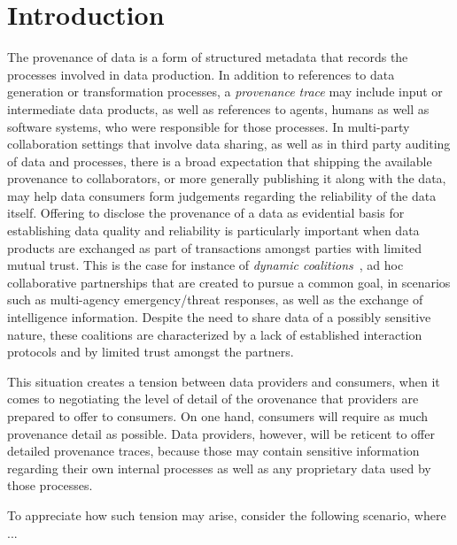 
\section{Introduction}


The provenance of data is a form of structured metadata that records the processes involved in data production. In addition to references to data generation or transformation processes, a \textit{provenance trace} may include input  or intermediate data products, as well as references to agents, humans as well as software systems, who were responsible for those processes.
%
In multi-party collaboration settings that involve data sharing, as well as in third party auditing of data and processes, there is a broad expectation that 
shipping the available provenance to collaborators, or more generally publishing it along with the data, may help data consumers form judgements regarding the reliability of the data itself.
%
%
Offering to disclose the provenance of a data as evidential basis for establishing data quality and reliability is particularly important when data products are exchanged as part of transactions amongst parties with limited mutual trust. 
This is the case for instance of \textit{dynamic coalitions}~\citep{BFJM06}, ad hoc collaborative partnerships that are created 
to pursue a common goal, in scenarios such as multi-agency emergency/threat responses, as well as the exchange of intelligence information. 
Despite the need to share data of a possibly sensitive nature, these coalitions are characterized by a lack of established interaction protocols and by limited trust amongst the partners. 

This situation creates a tension between data providers and consumers, when it comes to negotiating the level of detail of the orovenance that providers are prepared to offer to consumers. 
On one hand, consumers will require as much provenance detail as possible.
Data providers, however, will be reticent to offer detailed provenance traces, because those may contain sensitive information regarding their own internal processes as well as any proprietary data used by those processes.

To appreciate how such tension may arise, consider the following scenario, where ...  

 \\




